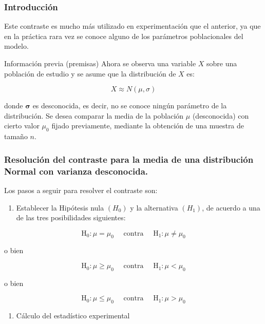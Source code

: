 \documentclass[
]{article}
\providecommand{\tightlist}{%
  \setlength{\itemsep}{0pt}\setlength{\parskip}{0pt}}
\begin{document}
\subsubsection{Introducción}\label{introducciuxf3n-4}

Este contraste es mucho más utilizado en experimentación que el anterior, ya que en la práctica rara vez se conoce alguno de los parámetros poblacionales del modelo.

Información previa (premisas)
Ahora se observa una variable \(X\) sobre una población de estudio y se asume que la distribución de \(X\) es:

\[
X \approx N(\mu, \sigma)
\]

donde \(\boldsymbol{\sigma}\) es desconocida, es decir, no se conoce ningún parámetro de la distribución. Se desea comparar la media de la población \(\mu\) (desconocida) con cierto valor \(\mu_{0}\) fijado previamente, mediante la obtención de una muestra de tamaño \(n\).

\subsubsection{Resolución del contraste para la media de una distribución Normal con varianza desconocida.}\label{resoluciuxf3n-del-contraste-para-la-media-de-una-distribuciuxf3n-normal-con-varianza-desconocida.}

Los pasos a seguir para resolver el contraste son:

\begin{enumerate}
\def\labelenumi{\arabic{enumi})}
\tightlist
\item
  Establecer la Hipótesis nula \(\left(H_{0}\right)\) y la alternativa \(\left(H_{1}\right)\), de acuerdo a una de las tres posibilidades siguientes:
\end{enumerate}

\[
\mathrm{H}_{0}: \mu=\mu_{0} \quad \text { contra } \quad \mathrm{H}_{1}: \mu \neq \mu_{0}
\]

o bien

\[
\mathrm{H}_{0}: \mu \geq \mu_{0} \quad \text { contra } \quad \mathrm{H}_{1}: \mu<\mu_{0}
\]

o bien

\[
\mathrm{H}_{0}: \mu \leq \mu_{0} \quad \text { contra } \quad \mathrm{H}_{1}: \mu>\mu_{0}
\]

\begin{enumerate}
\def\labelenumi{\arabic{enumi})}
\setcounter{enumi}{1}
\tightlist
\item
  Cálculo del estadístico experimental
\end{enumerate}
\end{document}
